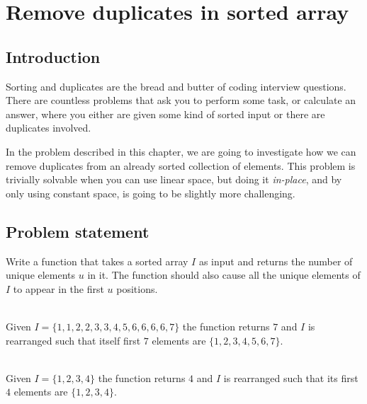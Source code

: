 %



\chapter{Remove duplicates in sorted array}
\label{ch:remove_duplicated_sorted_array_inplace}
\section*{Introduction}
Sorting and duplicates are the bread and butter of coding interview questions.
There are countless
problems that ask you to perform some task, or calculate an answer, where you either are given some kind of sorted
input or there are duplicates involved.

In the problem described in this chapter, we are going to investigate
how we can remove duplicates from an already sorted collection of elements. This problem is trivially solvable when you can use linear space, but doing it \textit{in-place}, and by only using constant space, is going to be slightly more challenging.

\section{Problem statement}
\begin{exercise}
\label{example:remove_duplicated_sorted_array_inplace:exercice1}
Write a function that takes a sorted array $I$ as input and returns the number of unique elements $u$ in it. 
The function should also cause all the unique elements of $I$ to appear in the first $u$ positions.



	\begin{example}
		\label{example:remove_duplicated_sorted_array_inplace:example1}
		\hfill \\
		Given $I=\{1,1,2,2,3,3,4,5,6,6,6,6,7\}$ the function returns $7$ and $I$ is rearranged such
		that itself first $7$ elements are $\{1,2,3,4,5,6,7\}$.				
	\end{example}

	\begin{example}
		\label{example:remove_duplicated_sorted_array_inplace:example2}
		\hfill \\
		Given $I=\{1,2,3,4\}$ the function returns $4$ and $I$ is rearranged such that its first $4$
		elements are $\{1,2,3,4\}$.	
	\end{example}
\end{exercise}

